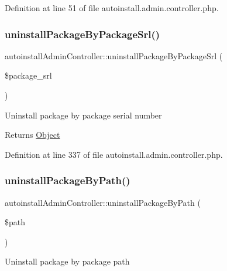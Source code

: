 Definition at line 51 of file autoinstall.\+admin.\+controller.\+php.

\mbox{\label{classautoinstallAdminController_a8e385d2ac38d446a83429c50679e3750}} 
\subsubsection{\texorpdfstring{uninstall\+Package\+By\+Package\+Srl()}{uninstallPackageByPackageSrl()}}
{\footnotesize\ttfamily autoinstall\+Admin\+Controller\+::uninstall\+Package\+By\+Package\+Srl (\begin{DoxyParamCaption}\item[{}]{\$package\+\_\+srl }\end{DoxyParamCaption})}

Uninstall package by package serial number

\begin{DoxyReturn}{Returns}
\hyperlink{classObject}{Object} 
\end{DoxyReturn}


Definition at line 337 of file autoinstall.\+admin.\+controller.\+php.

\mbox{\label{classautoinstallAdminController_ac52bb269b9e57d701b176615fa71faa5}} 
\subsubsection{\texorpdfstring{uninstall\+Package\+By\+Path()}{uninstallPackageByPath()}}
{\footnotesize\ttfamily autoinstall\+Admin\+Controller\+::uninstall\+Package\+By\+Path (\begin{DoxyParamCaption}\item[{}]{\$path }\end{DoxyParamCaption})}

Uninstall package by package path


